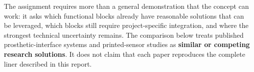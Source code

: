
{\fontsize{9.6}{11.35}\selectfont
The assignment requires more than a general demonstration that the concept can
work: it asks which functional blocks already have reasonable solutions that
can be leveraged, which blocks still require project-specific integration, and
where the strongest technical uncertainty remains. The comparison below treats
published prosthetic-interface systems and printed-sensor studies as
\textbf{similar or competing research solutions}. It does not claim that each
paper reproduces the complete liner described in this report.\par}

\hypertarget{q2-functional-blocks}{}

